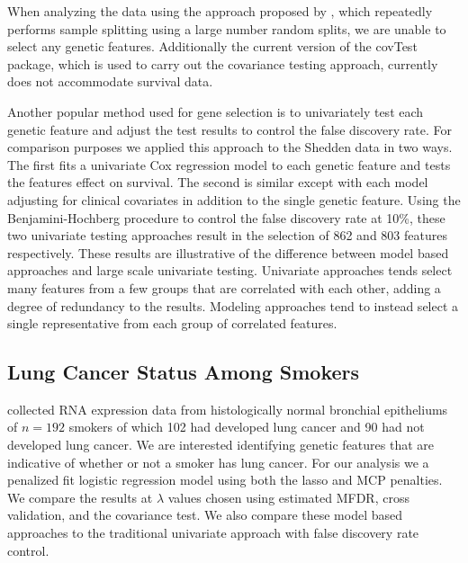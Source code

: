 When analyzing the data using the approach proposed by \citet{Meinshausen2009}, which repeatedly performs sample splitting using a large number random splits, we are unable to select any genetic features. Additionally the current version of the covTest package, which is used to carry out the covariance testing approach, currently does not accommodate survival data.

Another popular method used for gene selection is to univariately test each genetic feature and adjust the test results to control the false discovery rate.  For comparison purposes we applied this approach to the Shedden data in two ways.  The first fits a univariate Cox regression model to each genetic feature and tests the features effect on survival.  The second is similar except with each model adjusting for clinical covariates in addition to the single genetic feature.  Using the Benjamini-Hochberg procedure to control the false discovery rate at 10\%, these two univariate testing approaches result in the selection of 862 and 803 features respectively.  These results are illustrative of the difference between model based approaches and large scale univariate testing.  Univariate approaches tends select many features from a few groups that are correlated with each other, adding a degree of redundancy to the results.  Modeling approaches tend to instead select a single representative from each group of correlated features.  

\subsection{Lung Cancer Status Among Smokers}
\citet{Spira2007} collected RNA expression data from histologically normal bronchial epitheliums of $n = 192$ smokers of which 102 had developed lung cancer and 90 had not developed lung cancer.  We are interested identifying genetic features that are indicative of whether or not a smoker has lung cancer.  For our analysis we a penalized fit logistic regression model using both the lasso and MCP penalties. We compare the results at $\lambda$ values chosen using estimated MFDR, cross validation, and the covariance test.  We also compare these model based approaches to the traditional univariate approach with false discovery rate control.

